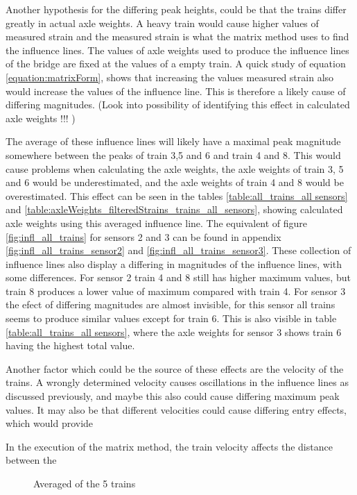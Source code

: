 Another hypothesis for the differing peak heights, could be that the trains differ greatly in actual axle weights. A heavy train would cause higher values of measured strain and the measured strain is what the matrix method uses to find the influence lines. The values of axle weights used to produce the influence lines of the bridge are fixed at the values of a empty train. A quick study of equation \ref{equation:matrixForm}, shows that increasing the values measured strain also would increase the values of the influence line. This is therefore a likely cause of differing magnitudes. (Look into possibility of identifying this effect in calculated axle weights !!! )

The average of these influence lines will likely have a maximal peak magnitude somewhere between the peaks of train 3,5 and 6 and train 4 and 8. This would cause problems when calculating the axle weights, the axle weights of train 3, 5 and 6 would be underestimated, and the axle weights of train 4 and 8 would be overestimated. This effect can be seen in the tables \ref{table:all_trains_all sensors} and \ref{table:axleWeights_filteredStrains_trains_all_sensors}, showing calculated axle weights using this averaged influence line. The equivalent of figure \ref{fig:infl_all_trains} for sensors 2 and 3 can be found in appendix \ref{fig:infl_all_trains_sensor2} and \ref{fig:infl_all_trains_sensor3}. These collection of influence lines also display a differing in magnitudes of the influence lines, with some differences. For sensor 2 train 4 and 8 still has higher maximum values, but train 8 produces a lower value of maximum compared with train 4. For sensor 3 the efect of differing magnitudes are almost invisible, for this sensor all trains seems to produce similar values except for train 6. This is also visible in table \ref{table:all_trains_all sensors}, where the axle weights for sensor 3 shows train 6 having the highest total value.

Another factor which could be the source of these effects are the velocity of the trains. A wrongly determined velocity causes oscillations in the influence lines as discussed previously, and maybe this also could cause differing maximum peak values.
It may also be that different velocities could cause differing entry effects, which would provide



In the execution of the matrix method, the train velocity affects the distance between the
\begin{figure}[H]
	\begin{adjustbox}{center}
		
	\end{adjustbox}
	\caption{Averaged of the 5 trains}
	\label{fig:infl_vec_averaged_wBridge}
\end{figure}

